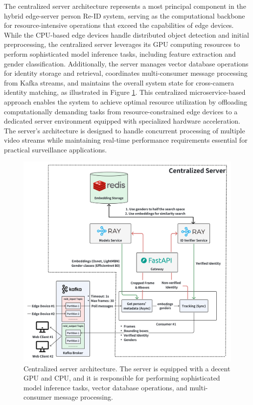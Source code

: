 The centralized server architecture represents a most principal component in the hybrid edge-server person Re-ID system, serving as the computational backbone for resource-intensive operations that exceed the capabilities of edge devices. While the CPU-based edge devices handle distributed object detection and initial preprocessing, the centralized server leverages its GPU computing resources to perform sophisticated model inference tasks, including feature extraction and gender classification. Additionally, the server manages vector database operations for identity storage and retrieval, coordinates multi-consumer message processing from Kafka streams, and maintains the overall system state for cross-camera identity matching, as illustrated in Figure \ref{fig:centralized_server_overview}. This centralized microservice-based approach enables the system to achieve optimal resource utilization by offloading computationally demanding tasks from resource-constrained edge devices to a dedicated server environment equipped with specialized hardware acceleration. The server's architecture is designed to handle concurrent processing of multiple video streams while maintaining real-time performance requirements essential for practical surveillance applications.

\begin{figure}[!htbp]
    \centering
    \includegraphics[width=1.05\textwidth]{Figure/centralized_overview.png}
    \caption{Centralized server architecture. The server is equipped with a decent GPU and CPU, and it is responsible for performing sophisticated model inference tasks, vector database operations, and multi-consumer message processing.}
    \label{fig:centralized_server_overview}
\end{figure}

